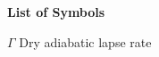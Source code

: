 \documentclass[master]{UWMThesis}
\begin{document}
\begin{singlespacing}

\tableofcontents

\listoffigures	%

\listoftables	%





\begin{center}{\clearpage\textbf{\Large \sc List of Symbols}}\end{center} %

$\Gamma$ \hfill Dry adiabatic lapse rate \vfill\clearpage

\end{singlespacing}


\end{document}
